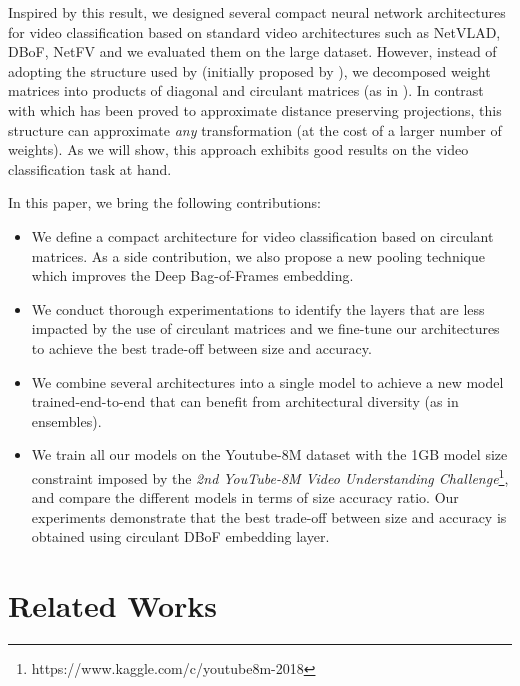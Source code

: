 Inspired by this result, we designed several compact neural network architectures for video classification based on standard video architectures such as NetVLAD, DBoF, NetFV and we evaluated them on the large \yt dataset.
However, instead of adopting the structure used by \cite{cheng} (initially proposed by \cite{VYBIRAL20111096}), we decomposed weight matrices into products of diagonal and circulant matrices (as in \cite{schmid2000decomposing}).
In contrast with \cite{VYBIRAL20111096} which has been proved to approximate distance preserving projections, this structure can approximate \emph{any} transformation (at the cost of a larger number of weights).
As we will show, this approach exhibits good results on the video classification task at hand. 

In this paper, we bring the following contributions:

\begin{itemize}
  \item We define a compact architecture for video classification based on circulant matrices.
  As a side contribution, we also propose a new pooling technique which improves the Deep Bag-of-Frames embedding. 
  \item We conduct thorough experimentations to identify the layers that are less impacted by the use of circulant matrices and we fine-tune our architectures to achieve the best trade-off between size and accuracy.  
  \item We combine several architectures into a single model to achieve a new model trained-end-to-end that can benefit from architectural diversity (as in ensembles).
  \item We train all our models on the Youtube-8M dataset with the 1GB model size constraint imposed by the \emph{2nd YouTube-8M Video Understanding Challenge}\footnote{https://www.kaggle.com/c/youtube8m-2018}, and compare the different models in terms of size \vs accuracy ratio.
  Our experiments demonstrate that the best trade-off between size and accuracy is obtained using circulant DBoF embedding layer.
\end{itemize}

\section{Related Works}
\label{section:ap2-related-work}

